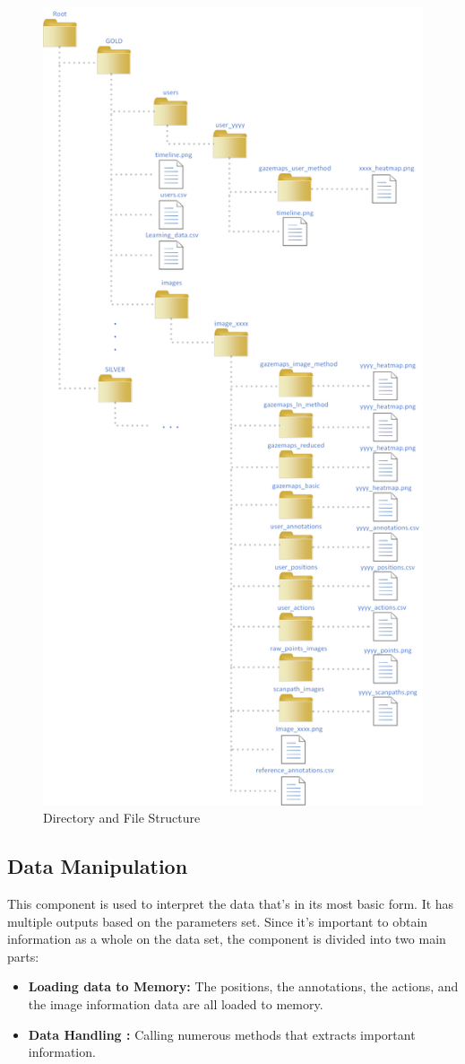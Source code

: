 \documentclass[a4paper,11pt]{report}
\numberwithin{figure}{section} %
\begin{document}
       \begin{figure}[H]
        \centering
         \includegraphics[width=.6\linewidth]{diagrams/directories.png}
         \caption{Directory and File Structure}
         \label{fig:struct}
       \end{figure}

	\subsection{Data Manipulation}

    This component is used to interpret the data that's in its most basic form.
    It has multiple outputs based on the parameters set.
    Since it's important to obtain information as a whole on the data set, the component is divided into two main parts:
    \begin{itemize}
        \item[\textbullet] \textbf{Loading data to Memory:} The positions, the annotations, the actions, and the image information data are all loaded to memory.
        \item[\textbullet] \textbf{Data Handling :} Calling numerous methods that extracts important information.
    \end{itemize}
\end{document}
